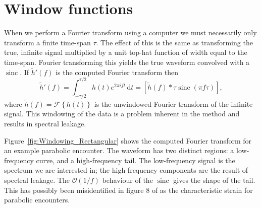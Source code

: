 \documentclass[useAMS,usedcolumn,usegraphicx,usenatbib]{mn2e}
\newcommand{\Figref}[1]{Figure~\ref{fig:#1}}
\DeclareMathOperator{\sinc}{sinc}
\newcommand{\dd}{\ensuremath{\mathrm{d}}}
\newcommand{\intd}[4]{\ensuremath{\int_{#1}^{#2}{#3}\,\dd{#4}}}
\newcommand{\order}[1]{\ensuremath{\mathcal{O}({#1})}}
\begin{document}



\appendix

\section{Window functions}\label{ap:window}

When we perform a Fourier transform using a computer we must necessarily only transform a finite time-span $\tau$. The effect of this is the same as transforming the true, infinite signal multiplied by a unit top-hat function of width equal to the time-span. Fourier transforming this yields the true waveform convolved with a $\sinc$. If $\tilde{h}'(f)$ is the computed Fourier transform then
\begin{equation}
\tilde{h}'(f) = \intd{-\tau/2}{\tau/2}{h(t)e^{2\pi i ft}}{t} = \left[\tilde{h}(f) \ast \tau \sinc(\pi f\tau)\right],
\end{equation}
where $\tilde{h}(f) = \mathscr{F}\left\{h(t)\right\}$ is the unwindowed Fourier transform of the infinite signal. This windowing of the data is a problem inherent in the method and results in spectral leakage.

\Figref{Windowing_Rectangular} shows the computed Fourier transform for an example parabolic encounter. The waveform has two distinct regions: a low-frequency curve, and a high-frequency tail. The low-frequency signal is the spectrum we are interested in; the high-frequency components are the result of spectral leakage. The $\order{1/{f}}$ behaviour of the $\sinc$ gives the shape of the tail. This has possibly been misidentified in figure 8 of \citet{Burko2007} as the characteristic strain for parabolic encounters.
\end{document}
